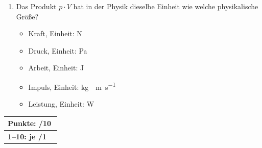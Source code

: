 \documentclass[11pt, a4paper]{article}
\begin{document}
\begin{enumerate}[label=\arabic*.,itemsep=18pt]
    \item Das Produkt $p \cdot V$ hat in der Physik dieselbe Einheit wie welche physikalische Größe?
    \begin{itemize}[label={$\square$},itemsep=1pt,topsep=0pt]
        \item Kraft, Einheit: \si{\newton}
        \item Druck, Einheit: \si{\pascal}
        \item Arbeit, Einheit: \si{\joule}
        \item Impuls, Einheit: \si{\kilogram\cdot \meter\per\second}
        \item Leistung, Einheit: \si{\watt}
    \end{itemize}
\end{enumerate}

\vfill
\begin{flushright}
\renewcommand{\arraystretch}{1.23}
\begin{tabular}{|l c|}
\hline
\multicolumn{2}{|l|}{\textbf{\large{Punkte: \quad\quad\quad /10}}}\\
\hline
\textbf{1--10: je /1} & \\
\hline
\end{tabular}
\end{flushright}
\end{document}
